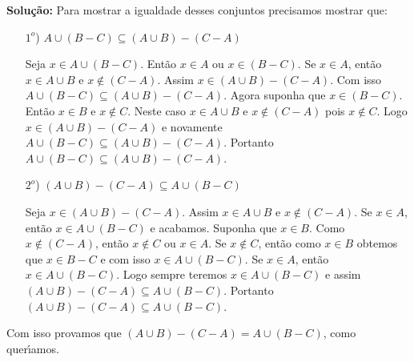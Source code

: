 \documentclass[12pt]{article}
\begin{document}
\noindent\textbf{Solu\c{c}\~ao:} Para mostrar a igualdade desses conjuntos precisamos mostrar que:
\begin{enumerate}
	\item [$1^o$)] $A \cup ( B - C) \subseteq (A \cup B) - (C - A)$

	Seja $x \in A \cup (B - C)$. Ent\~ao $x \in A$ ou $x \in (B - C)$. Se $x \in A$, ent\~ao $x \in A \cup B$ e $x \notin (C - A)$. Assim $x \in (A \cup B) - (C - A)$. Com isso $A \cup ( B - C) \subseteq (A \cup B) - (C - A)$. Agora suponha que $x \in (B - C)$. Ent\~ao $x \in B$ e $x \notin C$. Neste caso $x \in A \cup B$ e $x \notin (C - A)$ pois $x \notin C$. Logo $x \in (A \cup B) - (C - A)$ e novamente $A \cup ( B - C) \subseteq (A \cup B) - (C - A)$. Portanto $A \cup ( B - C) \subseteq (A \cup B) - (C - A)$.

	\item [$2^o$)] $(A \cup B) - (C - A) \subseteq A \cup ( B - C)$

	Seja $x \in (A \cup B) - (C - A)$. Assim $x \in A \cup B$ e $x \notin (C - A)$. Se $x \in A$, ent\~ao $x \in A \cup (B - C)$ e acabamos. Suponha que $x \in B$. Como $x \notin (C - A)$, ent\~ao $x \notin C$ ou $x \in A$. Se $x \notin C$, ent\~ao como $x \in B$ obtemos que $x \in B - C$ e com isso $x \in A \cup (B - C)$. Se $x \in A$, ent\~ao $x \in A \cup (B - C)$. Logo sempre teremos $x \in A \cup (B - C)$ e assim $(A \cup B) - (C - A) \subseteq A \cup ( B - C)$. Portanto $(A \cup B) - (C - A) \subseteq A \cup ( B - C)$.
\end{enumerate}
Com isso provamos que $(A \cup B) - (C - A) = A \cup ( B - C)$, como quer{\'\i}amos.
\end{document}

